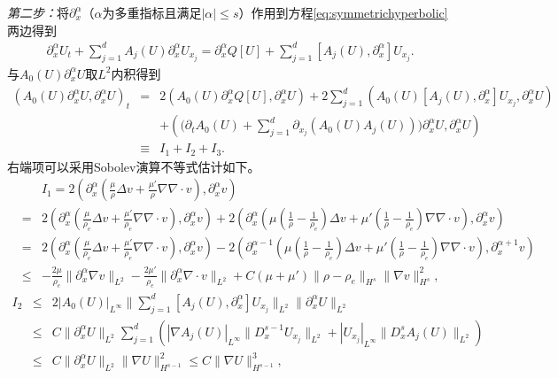 \documentclass{article}
\begin{document}
\emph{第二步：}将$\partial_x^\alpha$（$\alpha$为多重指标且满足$|\alpha|\le s$）作用到方程\eqref{eq:symmetrichyperbolic}两边得到
\begin{eqnarray}\label{eq:higher}
    \partial_x^\alpha U_t + \sum_{j=1}^d A_j(U) \partial_x^\alpha U_{x_j} = \partial_x^\alpha Q[U] + \sum_{j=1}^d [A_j(U),\partial_x^\alpha] U_{x_j}.
\end{eqnarray}
与$A_0(U) \partial_x^\alpha U$取$L^2$内积得到
\begin{eqnarray}\label{eq:HighOrderInner}
  (A_0(U) \partial_x^\alpha U, \partial_x^\alpha U)_t
 & = & 2(A_0(U) \partial_x^\alpha Q[U],\partial_x^\alpha U) + 2 \sum_{j=1}^d (A_0(U) [A_j(U),\partial_x^\alpha]U_{x_j},\partial_x^\alpha U)  \nonumber\\
  &&+ \left( \big( \partial_t A_0(U) + \sum_{j=1}^d \partial_{x_j} (A_0(U) A_j(U))\big) \partial_x^\alpha U,\partial_x^\alpha U \right)  \\
  &\equiv& I_1 + I_2 + I_3 .  \nonumber
\end{eqnarray}
右端项可以采用Sobolev演算不等式\cite{majda2012compressible}估计如下。
\begin{eqnarray*}
 && I_1 = 2(\partial_x^\alpha(\frac{\mu}{\rho} \Delta  v  + \frac{\mu'}{\rho} \nabla \nabla \cdot  v ), \partial_x^\alpha  v ) \\
  &=& 2(\partial_x^\alpha (\frac{\mu}{\rho_e} \Delta  v  + \frac{\mu'}{\rho_e} \nabla \nabla \cdot  v ), \partial_x^\alpha  v ) + 2( \partial_x^\alpha ( \mu (\frac{1}{\rho}-\frac{1}{\rho_e}) \Delta  v  + \mu'(\frac{1}{\rho} - \frac{1}{\rho_e}) \nabla \nabla \cdot  v ), \partial_x^\alpha v ) \\
  &=& 2(\partial_x^\alpha (\frac{\mu}{\rho_e} \Delta  v  + \frac{\mu'}{\rho_e} \nabla \nabla \cdot  v ), \partial_x^\alpha  v )
  - 2( \partial_x^{\alpha-1} ( \mu (\frac{1}{\rho}-\frac{1}{\rho_e}) \Delta  v  + \mu'(\frac{1}{\rho} - \frac{1}{\rho_e}) \nabla \nabla \cdot  v ),\partial_x^{\alpha +1}  v ) \\
  &\le& -\frac{2\mu}{\rho_e} \|\partial_x^\alpha \nabla  v \|_{L^2}  -\frac{2\mu'}{\rho_e} \|\partial_x^\alpha \nabla \cdot  v \|_{L^2} + C(\mu+\mu')\| \rho -\rho_e \|_{H^s} \|\nabla  v \|_{H^s}^2 ,
\end{eqnarray*}
\begin{eqnarray*}
  I_2 &\le& 2|A_0(U)|_{L^\infty} \|\sum_{j=1}^d [A_j(U),\partial_x^\alpha]U_{x_j} \|_{L^2} \|\partial_x^\alpha U\|_{L^2} \\
  &\le& C \|\partial_x^\alpha U\|_{L^2} \sum_{j=1}^d (|\nabla A_j(U)|_{L^\infty} \|D^{s-1}_x U_{x_j}\|_{L^2}+ |U_{x_j}|_{L^\infty} \|D^s_x A_j(U)\|_{L^2}) \\
  &\le& C \|\partial_x^\alpha U\|_{L^2} \|\nabla U\|_{H^{s-1}}^2 \le C\|\nabla U\|_{H^{s-1}}^3,
\end{eqnarray*}
\end{document}
